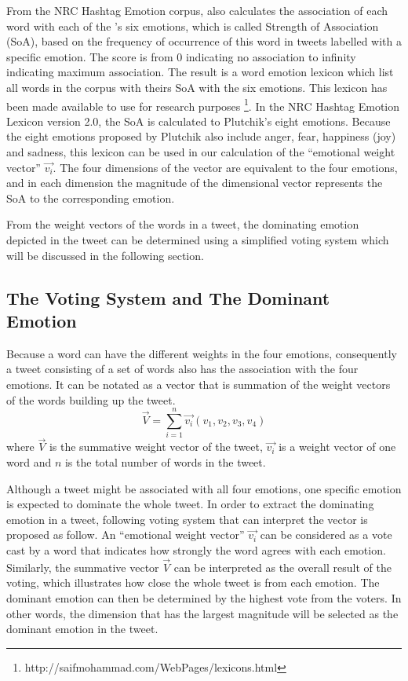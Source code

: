 From the NRC Hashtag Emotion corpus, \citet{mohammad2012emotional} also calculates the association of each word with each of the \citet{ekman1971constants}'s six emotions, which is called Strength of Association (SoA), based on the frequency of occurrence of this word in tweets labelled with a specific emotion. The score is from 0 indicating no association to infinity indicating maximum association. The result is a word emotion lexicon which list all words in the corpus with theirs SoA with the six emotions. This lexicon has been made available to use for research purposes \footnote{http://saifmohammad.com/WebPages/lexicons.html}. In the NRC Hashtag Emotion Lexicon version 2.0, the SoA is calculated to Plutchik's eight emotions. Because the eight emotions proposed by Plutchik also include anger, fear, happiness (joy) and sadness, this lexicon can be used in our calculation of the ``emotional weight vector'' \(\vec{v_i}\). The four dimensions of the vector are equivalent to the four emotions, and in each dimension the magnitude of the dimensional vector represents the SoA to the corresponding emotion.

From the weight vectors of the words in a tweet, the dominating emotion depicted in the tweet can be determined using a simplified voting system which will be discussed in the following section.

\subsection{The Voting System and The Dominant Emotion}

Because a word can have the different weights in the four emotions, consequently a tweet consisting of a set of words also has the association with the four emotions. It can be notated as a vector that is summation of the weight vectors of the words building up the tweet.
\[
	\vec{V} = \sum_{i=1}^{n} \vec{v_i}(v_1, v_2, v_3, v_4)
\]
where \(\vec{V}\) is the summative weight vector of the tweet, \(\vec{v_i}\) is a weight vector of one word and \(n\) is the total number of words in the tweet.

Although a tweet might be associated with all four emotions, one specific emotion is expected to dominate the whole tweet. In order to extract the dominating emotion in a tweet, following voting system that can interpret the vector is proposed as follow. An ``emotional weight vector'' \(\vec{v_i}\) can be considered as a vote cast by a word that indicates how strongly the word agrees with each emotion. Similarly, the summative vector \(\vec{V}\) can be interpreted as the overall result of the voting, which illustrates how close the whole tweet is from each emotion. The dominant emotion can then be determined by the highest vote from the voters. In other words, the dimension that has the largest magnitude will be selected as the dominant emotion in the tweet.

